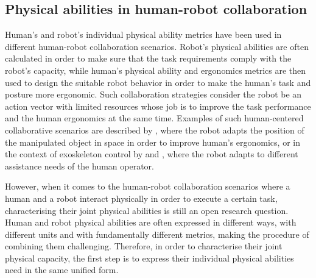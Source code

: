     

\subsection{Physical abilities in human-robot collaboration}

Human's and robot's individual physical ability metrics have been used in different human-robot collaboration scenarios. Robot's physical abilities are often calculated in order to make sure that the task requirements comply with the robot's capacity, while human's physical ability and ergonomics metrics are then used to design the suitable robot behavior in order to make the human's task and posture more ergonomic. Such collaboration strategies consider the robot be an action vector with limited resources whose job is to improve the task performance and the human ergonomics at the same time. Examples of such human-centered collaborative scenarios are described by \citet{KIM2021102084}, where the robot adapts the position of the manipulated object in space in order to improve human's ergonomics, or in the context of exoskeleton control by \citet{carmichael2013admittance,carmichael_towards_2011} and \citet{petric2019assistive}, where the robot adapts to different assistance needs of the human operator.

However, when it comes to the human-robot collaboration scenarios where a human and a robot interact physically in order to execute a certain task, characterising their joint physical abilities is still an open research question. Human and robot physical abilities are often expressed in different ways, with different units and with fundamentally different metrics, making the procedure of combining them challenging. Therefore, in order to characterise their joint physical capacity, the first step is to express their individual physical abilities need in the same unified form. 

